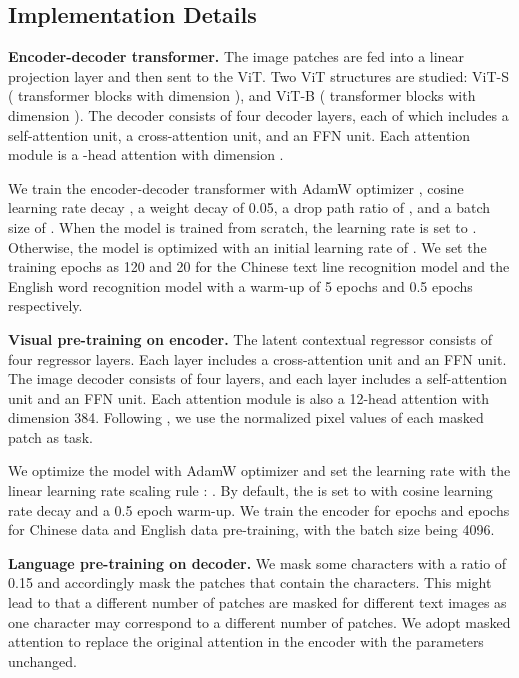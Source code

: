 \subsection{Implementation Details}
\noindent\textbf{Encoder-decoder transformer.} The image patches are fed into a linear projection layer and then sent to the ViT. Two ViT structures are studied: ViT-S ( transformer blocks with dimension ), and ViT-B ( transformer blocks with dimension ). The decoder consists of four decoder layers, each of which includes a self-attention unit, a cross-attention unit, and an FFN unit. Each attention module is a -head attention with dimension .

We train the encoder-decoder transformer with AdamW optimizer \cite{adamw}, cosine learning rate decay \cite{cosinedecay}, a weight decay of 0.05, a drop path ratio of , and a batch size of . When the model is trained from scratch, the learning rate is set to . Otherwise, the model is optimized with an initial learning rate of . We set the training epochs as 120 and 20 for the Chinese text line recognition model and the English word recognition model with a warm-up of 5 epochs and 0.5 epochs respectively.  

\vspace{2mm}
\noindent\textbf{Visual pre-training on encoder.}
The latent contextual regressor consists of four regressor layers. Each layer includes a cross-attention unit and an FFN unit. The image decoder consists of four layers, and each layer includes a self-attention unit and an FFN unit. Each attention module is also a 12-head attention with dimension 384. Following \cite{mae}, we use the normalized pixel values of each masked patch as task.

We optimize the model with AdamW optimizer and set the learning rate with the linear learning rate scaling rule \cite{linear-rule}: . By default, the  is set to  with cosine learning rate decay and a 0.5 epoch warm-up.  We train the encoder for  epochs and  epochs for Chinese data and English data pre-training, with the batch size being 4096. 

\vspace{2mm}
\noindent\textbf{Language pre-training on decoder.}
We mask some characters with a ratio of 0.15 and accordingly mask the patches that contain the characters. This might lead to that a different number of patches are masked for different text images as one character may correspond to a different number of patches. We adopt masked attention to replace the original attention in the encoder with the parameters unchanged.

